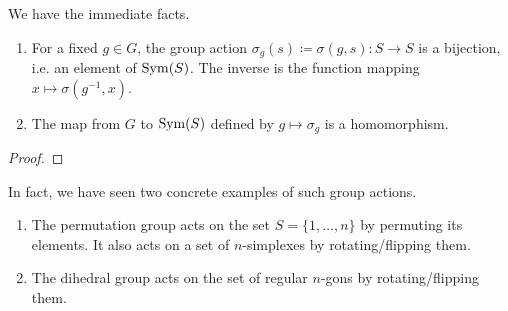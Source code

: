   \begin{theorem}
    We have the immediate facts. 
    \begin{enumerate}
      \item For a fixed $g \in G$, the group action $\sigma_g (s) \coloneqq \sigma(g, s): S \to S$ is a bijection, i.e. an element of $\Sym(S)$. The inverse is the function mapping $x \mapsto \sigma(g^{-1}, x)$.
      \item The map from $G$ to $\Sym(S)$ defined by $g \mapsto \sigma_g$ is a homomorphism. 
    \end{enumerate}
  \end{theorem}
  \begin{proof}
    
  \end{proof}

  \begin{example}
    In fact, we have seen two concrete examples of such group actions. 
    \begin{enumerate}
      \item The permutation group acts on the set $S = \{1, \ldots, n\}$ by permuting its elements. It also acts on a set of $n$-simplexes by rotating/flipping them. 
      \item The dihedral group acts on the set of regular $n$-gons by rotating/flipping them. 
    \end{enumerate}
  \end{example}


